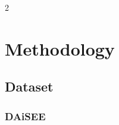 \begin{multicols}{2}

  \section{Methodology}
  \subsection{Dataset}
  \subsubsection{DAiSEE}


\end{multicols}
